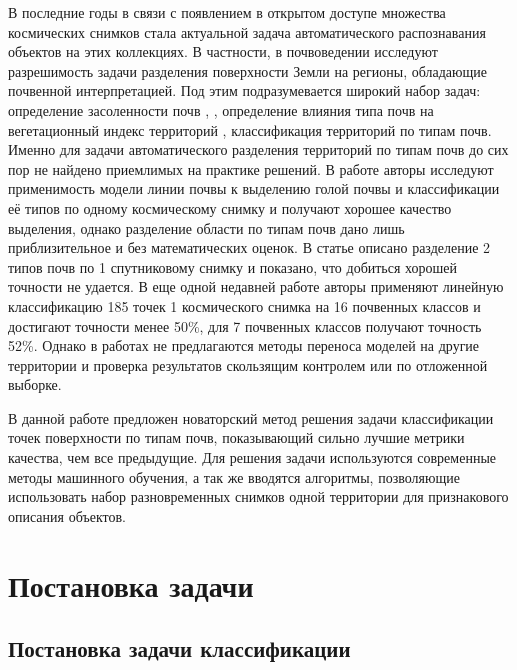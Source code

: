 \documentclass[14pt]{extarticle}
\begin{document}
\par
В последние годы в связи с появлением в открытом доступе множества космических снимков стала
актуальной задача автоматического распознавания объектов на этих коллекциях. В частности,
в почвоведении исследуют разрешимость задачи разделения поверхности Земли на регионы,
обладающие почвенной интерпретацией. Под этим подразумевается широкий набор задач: 
определение засоленности почв \cite{salt-1}, \cite{salt-2}, 
определение влияния типа почв на вегетационный
индекс территорий \cite{soil-line-2}, классификация территорий по типам почв. 
Именно для задачи автоматического разделения территорий по типам почв до сих пор не найдено
приемлимых на практике решений. В работе \cite{soil-line-1} авторы исследуют применимость
модели линии почвы к выделению голой почвы и классификации её типов по одному космическому снимку
и получают хорошее качество выделения, однако разделение области по типам почв дано лишь 
приблизительное и без математических оценок. В статье \cite{soil-line-3} описано разделение
2 типов почв по 1 спутниковому снимку и показано, что добиться хорошей точности не удается.
В еще одной недавней работе \cite{soil-line-6} авторы применяют линейную классификацию 185
точек 1 космического снимка на 16 почвенных классов и достигают точности менее 50\%,
для 7 почвенных классов получают точность 52\%. Однако в работах не предлагаются методы
переноса моделей на другие территории и проверка результатов скользящим контролем или по 
отложенной выборке.
\par
В данной работе предложен новаторский метод решения задачи классификации точек поверхности
по типам почв, показывающий сильно лучшие метрики качества, чем все предыдущие. Для решения
задачи используются современные методы машинного обучения, а так же вводятся алгоритмы,
позволяющие использовать набор разновременных снимков одной территории для признакового 
описания объектов.

\section{Постановка задачи}


\subsection{Постановка задачи классификации}
\end{document}
